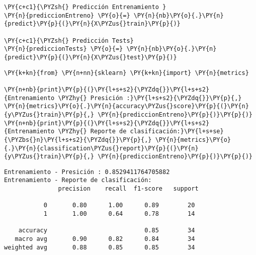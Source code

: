     \begin{tcolorbox}[breakable, size=fbox, boxrule=1pt, pad at break*=1mm,colback=cellbackground, colframe=cellborder]
\begin{Verbatim}[commandchars=\\\{\}]
\PY{c+c1}{\PYZsh{} Predicción Entrenamiento }
\PY{n}{prediccionEntreno} \PY{o}{=} \PY{n}{nb}\PY{o}{.}\PY{n}{predict}\PY{p}{(}\PY{n}{X\PYZus{}train}\PY{p}{)}

\PY{c+c1}{\PYZsh{} Predicción Tests}
\PY{n}{prediccionTests} \PY{o}{=} \PY{n}{nb}\PY{o}{.}\PY{n}{predict}\PY{p}{(}\PY{n}{X\PYZus{}test}\PY{p}{)}
\end{Verbatim}
\end{tcolorbox}

    \begin{tcolorbox}[breakable, size=fbox, boxrule=1pt, pad at break*=1mm,colback=cellbackground, colframe=cellborder]
\begin{Verbatim}[commandchars=\\\{\}]
\PY{k+kn}{from} \PY{n+nn}{sklearn} \PY{k+kn}{import} \PY{n}{metrics}

\PY{n+nb}{print}\PY{p}{(}\PY{l+s+s2}{\PYZdq{}}\PY{l+s+s2}{Entrenamiento \PYZhy{} Presición :}\PY{l+s+s2}{\PYZdq{}}\PY{p}{,} \PY{n}{metrics}\PY{o}{.}\PY{n}{accuracy\PYZus{}score}\PY{p}{(}\PY{n}{y\PYZus{}train}\PY{p}{,} \PY{n}{prediccionEntreno}\PY{p}{)}\PY{p}{)}
\PY{n+nb}{print}\PY{p}{(}\PY{l+s+s2}{\PYZdq{}}\PY{l+s+s2}{Entrenamiento \PYZhy{} Reporte de clasificación:}\PY{l+s+se}{\PYZbs{}n}\PY{l+s+s2}{\PYZdq{}}\PY{p}{,} \PY{n}{metrics}\PY{o}{.}\PY{n}{classification\PYZus{}report}\PY{p}{(}\PY{n}{y\PYZus{}train}\PY{p}{,} \PY{n}{prediccionEntreno}\PY{p}{)}\PY{p}{)}
\end{Verbatim}
\end{tcolorbox}

    \begin{Verbatim}[commandchars=\\\{\}]
Entrenamiento - Presición : 0.8529411764705882
Entrenamiento - Reporte de clasificación:
               precision    recall  f1-score   support

           0       0.80      1.00      0.89        20
           1       1.00      0.64      0.78        14

    accuracy                           0.85        34
   macro avg       0.90      0.82      0.84        34
weighted avg       0.88      0.85      0.85        34

    \end{Verbatim}

